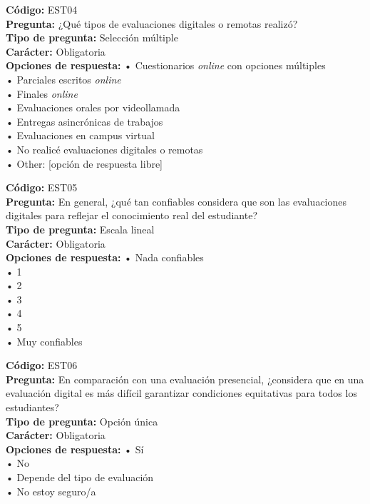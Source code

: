 \begin{infobox}\small
\textbf{\textcolor{accent}{Código:}} EST04\\
\textbf{\textcolor{accent}{Pregunta:}} ¿Qué tipos de evaluaciones digitales o remotas realizó?\\
\textbf{\textcolor{accent}{Tipo de pregunta:}} Selección múltiple\\
\textbf{\textcolor{accent}{Carácter:}} Obligatoria\\
\textbf{\textcolor{accent}{Opciones de respuesta:}} • Cuestionarios \textit{online} con opciones múltiples \\ • Parciales escritos \textit{online} \\ • Finales \textit{online} \\ • Evaluaciones orales por videollamada \\ • Entregas asincrónicas de trabajos \\ • Evaluaciones en campus virtual \\ • No realicé evaluaciones digitales o remotas \\ • Other: [opción de respuesta libre]\\
\end{infobox}
\begin{infobox}\small
\textbf{\textcolor{accent}{Código:}} EST05\\
\textbf{\textcolor{accent}{Pregunta:}} En general, ¿qué tan confiables considera que son las evaluaciones digitales para reflejar el conocimiento real del estudiante?\\
\textbf{\textcolor{accent}{Tipo de pregunta:}} Escala lineal\\
\textbf{\textcolor{accent}{Carácter:}} Obligatoria\\
\textbf{\textcolor{accent}{Opciones de respuesta:}} • Nada confiables \\ • 1 \\ • 2 \\ • 3 \\ • 4 \\ • 5 \\ • Muy confiables\\
\end{infobox}
\begin{infobox}\small
\textbf{\textcolor{accent}{Código:}} EST06\\
\textbf{\textcolor{accent}{Pregunta:}} En comparación con una evaluación presencial, ¿considera que en una evaluación digital es más difícil garantizar condiciones equitativas para todos los estudiantes?\\
\textbf{\textcolor{accent}{Tipo de pregunta:}} Opción única\\
\textbf{\textcolor{accent}{Carácter:}} Obligatoria\\
\textbf{\textcolor{accent}{Opciones de respuesta:}} • Sí \\ • No \\ • Depende del tipo de evaluación \\ • No estoy seguro/a\\
\end{infobox}
